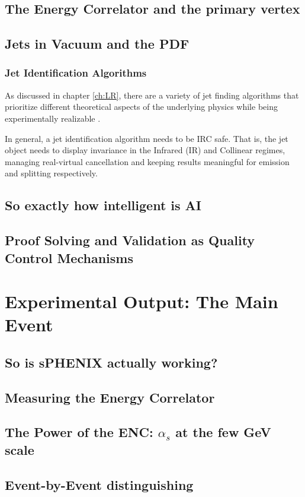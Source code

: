 \documentclass[letterpaper, 12pt, oneside]{book}
\theoremstyle{definition}
\begin{document}
\chapter{The Energy Correlator and the primary vertex}
\chapter{Jets in Vacuum and the PDF}
\section{Jet Identification Algorithms}
As discussed in chapter \ref{ch:LR}, there are a variety of jet finding algorithms that prioritize different theoretical aspects of the underlying physics while being experimentally realizable \cite{Dokshitzer1997} \cite{Atkin2015}. 

In general, a jet identification algorithm needs to be IRC safe. 
That is, the jet object needs to display invariance in the Infrared (IR) and Collinear regimes, managing real-virtual cancellation and keeping results meaningful for emission and splitting respectively. 

\chapter{So exactly how intelligent is AI}
\chapter{Proof Solving and Validation as Quality Control Mechanisms}
\part{Experimental Output: The Main Event}
\chapter{So is sPHENIX actually working?}
\chapter{Measuring the Energy Correlator}
\chapter{The Power of the ENC: $\alpha_s$ at the few GeV scale}
\chapter{Event-by-Event distinguishing}
\end{document}
